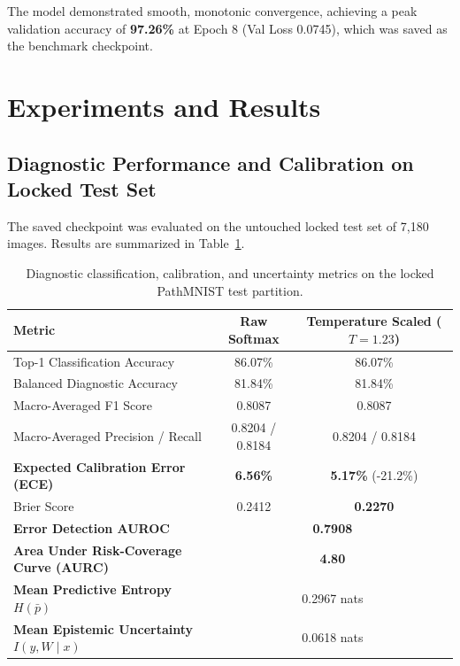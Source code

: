 \documentclass[11pt,a4paper]{article}
\begin{document}
The model demonstrated smooth, monotonic convergence, achieving a peak validation accuracy of \textbf{97.26\%} at Epoch 8 (Val Loss 0.0745), which was saved as the benchmark checkpoint.

\section{Experiments and Results}

\subsection{Diagnostic Performance and Calibration on Locked Test Set}
The saved checkpoint was evaluated on the untouched locked test set of 7,180 images. Results are summarized in Table~\ref{tab:test_results}.

\begin{table}[H]
\centering
\small
\begin{tabular}{lcc}
\toprule
\textbf{Metric} & \textbf{Raw Softmax} & \textbf{Temperature Scaled ($T=1.23$)} \\
\midrule
Top-1 Classification Accuracy & 86.07\% & 86.07\% \\
Balanced Diagnostic Accuracy & 81.84\% & 81.84\% \\
Macro-Averaged F1 Score & 0.8087 & 0.8087 \\
Macro-Averaged Precision / Recall & 0.8204 / 0.8184 & 0.8204 / 0.8184 \\
\textbf{Expected Calibration Error (ECE)} & \textbf{6.56\%} & \textbf{5.17\%} (-21.2\%) \\
Brier Score & 0.2412 & \textbf{0.2270} \\
\midrule
\textbf{Error Detection AUROC} & \multicolumn{2}{c}{\textbf{0.7908}} \\
\textbf{Area Under Risk-Coverage Curve (AURC)} & \multicolumn{2}{c}{\textbf{4.80}} \\
\textbf{Mean Predictive Entropy $H(\bar{p})$} & \multicolumn{2}{c}{0.2967 nats} \\
\textbf{Mean Epistemic Uncertainty $I(y, W \mid x)$} & \multicolumn{2}{c}{0.0618 nats} \\
\bottomrule
\end{tabular}
\caption{Diagnostic classification, calibration, and uncertainty metrics on the locked PathMNIST test partition.}
\label{tab:test_results}
\end{table}
\end{document}
